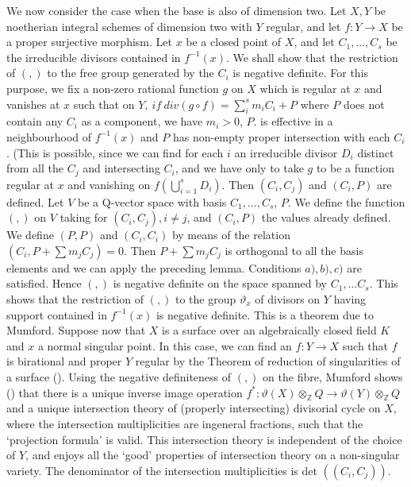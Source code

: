 We now consider the case when the base is also of dimension two. Let
$X,Y$ be noetherian integral schemes of dimension two with $Y$
regular, and let $f:Y \to X$ be a proper surjective morphism. Let $x$
be a closed point of $X$, and let $C_1,\ldots, C_s$ be the irreducible
divisors contained in $f^{-1}(x)$. We shall show that the restriction
of $( , )$ to the free group generated  by the  $C_i$ is negative
definite. For this purpose, we fix a non-zero rational function $g$ on
$X$  which is regular at $x$ and vanishes at $x$ such that on $Y ,~if
~div(g\circ f)=\sum\limits^s_i m_iC_i+P$  where  $P$ does not contain
any $C_i$ as a component, we have $m_i > 0$, $P$. is effective in a
neighbourhood of $f^{-1}(x)$ and $P$ has non-empty proper intersection
with each $C_i$.  (This is possible, since we can find\pageoriginale
for each $i$ an 
irreducible divisor $D_i$ distinct from all the $C_j$ and intersecting
$C_i$, and we have only to take $g$ to be a function regular at $x$
and vanishing on $f(\bigcup\limits^{s}_{i = 1} D_i)$. Then $(C_i,C_j)$
and $(C_i,P)$ are defined. Let $V$ be a Q-vector space with basis
$C_1,\ldots,C_s$, $P$. We define the function $(, )$ on $V$ taking for
$(C_i,C_j), i\neq j$, and $(C_i, P)$ the values already defined. We
define $(P,P)$ and $(C_i,C_i)$  by means of the relation $(C_i,P+\sum
m_jC_j)=0$. Then $P+\sum m_j C_j$ is orthogonal to all the basis
elements and we can apply the preceding lemma. Conditions $a),b),c)$
are satisfied. Hence $( , )$ is negative definite on the space spanned
by $C_1,\ldots C_s$. This shows that the restriction of $( , )$ to the
group $\vartheta_x$ of divisors on $Y$ having support contained in
$f^{-1}(x)$ is negative definite. This is a theorem due to
Mumford. Suppose now that $X$ is a surface over an algebraically
closed field $K$ and $x$ a normal singular point. In this case, we can
find an $f:Y\to X$ such that $f$ is birational and proper $Y$ regular
by the Theorem of reduction of singularities of a surface
(\cite{key1}). Using the negative definiteness of $( , )$ on the fibre,
Mumford shows (\cite{key17}) that there is a unique inverse image operation
$f^*:\vartheta (X) \otimes_{\mathbb{Z}}Q\to
\vartheta(Y)\otimes_{\mathbb{Z}}Q $ and a unique intersection theory
of (properly intersecting) divisorial cycle on $X$, where the
intersection multiplicities are in\pageoriginale  general fractions,
such that the 
`projection formula' is valid. This intersection theory is independent
of the choice of $Y$, and enjoys all the `good' properties of
intersection theory on a non-singular variety. The denominator of the
intersection multiplicities is det $((C_i,C_j))$. 

